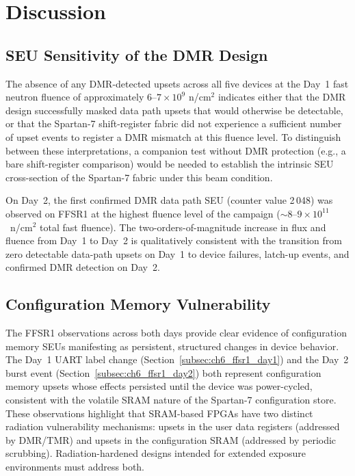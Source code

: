 \section{Discussion}
\label{sec:ch6_discussion}

\subsection{SEU Sensitivity of the DMR Design}
\label{subsec:ch6_disc_seu}

The absence of any DMR-detected upsets across all five devices at the
Day~1 fast neutron fluence of approximately $6$--$7 \times 10^9$
n/cm$^2$ indicates either that the DMR design successfully masked data
path upsets that would otherwise be detectable, or that the Spartan-7
shift-register fabric did not experience a sufficient number of upset
events to register a DMR mismatch at this fluence level.  To distinguish
between these interpretations, a companion test without DMR protection
(e.g., a bare shift-register comparison) would be needed to establish
the intrinsic SEU cross-section of the Spartan-7 fabric under this beam
condition.

On Day~2, the first confirmed DMR data path SEU (counter value 2\,048)
was observed on FFSR1 at the highest fluence level of the campaign
($\sim$$8$--$9 \times 10^{11}$~n/cm$^2$ total fast fluence).  The
two-orders-of-magnitude increase in flux and fluence from Day~1 to Day~2
is qualitatively consistent with the transition from zero detectable
data-path upsets on Day~1 to device failures, latch-up events, and
confirmed DMR detection on Day~2.

\subsection{Configuration Memory Vulnerability}
\label{subsec:ch6_disc_cfg}

The FFSR1 observations across both days provide clear evidence of
configuration memory SEUs manifesting as persistent, structured changes
in device behavior.  The Day~1 UART label change
(Section~\ref{subsec:ch6_ffsr1_day1}) and the Day~2 burst event
(Section~\ref{subsec:ch6_ffsr1_day2}) both represent configuration memory
upsets whose effects persisted until the device was power-cycled,
consistent with the volatile SRAM nature of the Spartan-7 configuration
store.  These observations highlight that SRAM-based FPGAs have two
distinct radiation vulnerability mechanisms: upsets in the user data
registers (addressed by DMR/TMR) and upsets in the configuration SRAM
(addressed by periodic scrubbing).  Radiation-hardened designs intended
for extended exposure environments must address both.

